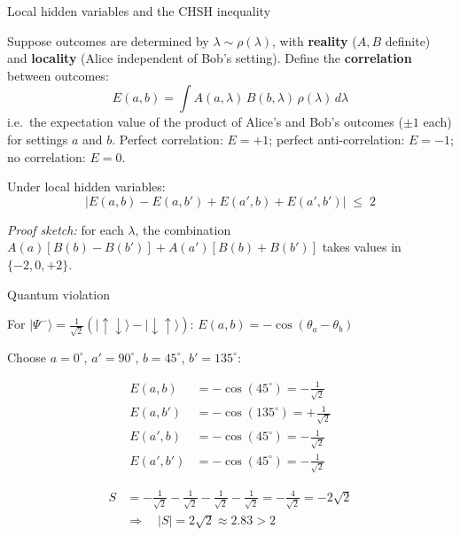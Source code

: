 \documentclass[fleql]{beamer}
\newcommand{\kw}[1]{\textbf{#1}}
\newcommand{\ket}[1]{|#1\rangle}
\begin{document}
\begin{frame}{Local hidden variables and the CHSH inequality}

  Suppose outcomes are determined by $\lambda\sim\rho(\lambda)$,
  with \kw{reality} ($A,B$ definite) and \kw{locality}
  (Alice independent of Bob's setting). Define the
  \kw{correlation} between outcomes:
  \[
  E(a,b) = \int A(a,\lambda)\,B(b,\lambda)\,\rho(\lambda)\,d\lambda
  \]
  i.e.\ the expectation value of the product of Alice's and Bob's
  outcomes ($\pm 1$ each) for settings $a$ and $b$.
  Perfect correlation: $E=+1$; perfect anti-correlation: $E=-1$;
  no correlation: $E=0$.

  Under local hidden variables:
  \[
  \bigl|E(a,b) - E(a,b') + E(a',b) + E(a',b')\bigr| \;\leq\; 2
  \]

  \small \textit{Proof sketch:} for each $\lambda$, the combination
  $A(a)[B(b)-B(b')] + A(a')[B(b)+B(b')]$ takes values in
  $\{-2,0,+2\}$.

\end{frame}

\begin{frame}{Quantum violation}

  For $\ket{\Psi^-} = \tfrac{1}{\sqrt{2}}(\ket{\uparrow\downarrow}
  -\ket{\downarrow\uparrow})$:\quad
  $E(a,b) = -\cos(\theta_a-\theta_b)$

  \vspace{0.3em}
  Choose $a=0^\circ$, $a'=90^\circ$, $b=45^\circ$, $b'=135^\circ$:

  \begin{align*}
  E(a,b)   &= -\cos(45^\circ)  = -\tfrac{1}{\sqrt{2}} \\[3pt]
  E(a,b')  &= -\cos(135^\circ) = +\tfrac{1}{\sqrt{2}} \\[3pt]
  E(a',b)  &= -\cos(45^\circ)  = -\tfrac{1}{\sqrt{2}} \\[3pt]
  E(a',b') &= -\cos(45^\circ)  = -\tfrac{1}{\sqrt{2}}
  \end{align*}

  \begin{align*}
  S &= -\tfrac{1}{\sqrt{2}} - \tfrac{1}{\sqrt{2}}
     - \tfrac{1}{\sqrt{2}} - \tfrac{1}{\sqrt{2}}
   = -\tfrac{4}{\sqrt{2}} = -2\sqrt{2} \\[6pt]
  &\Rightarrow\quad \boxed{|S| = 2\sqrt{2} \approx 2.83 > 2}
  \end{align*}

\end{frame}
\end{document}
